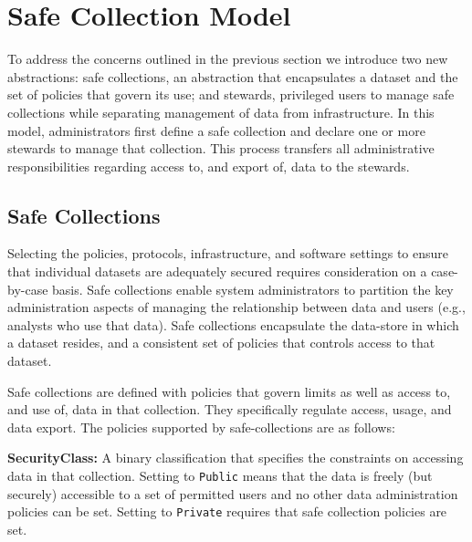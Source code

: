 \section{Safe Collection Model}
\label{sec:architecture}


To address the concerns outlined in the previous section we introduce two
new abstractions: safe collections, an abstraction that encapsulates
a dataset and the set of policies that govern its use; and stewards, privileged users
to manage safe collections while separating management of data from infrastructure.
In this model, administrators first define a safe collection and declare one
or more stewards to manage that collection. This process transfers
all administrative responsibilities regarding access to, and export of, data to the stewards.

\subsection{Safe Collections}

Selecting the policies, protocols, infrastructure, and
software settings to ensure that individual datasets are adequately secured requires consideration
on a case-by-case basis.
Safe collections enable system administrators to partition the key administration
aspects of managing the relationship between data and users (e.g., analysts who use that data).
Safe collections encapsulate the data-store in which a dataset resides, and a consistent set of policies
that controls access to that dataset.

Safe collections are defined with policies that govern limits as well as access to, and use of,
data in that collection. They specifically regulate access, usage, and data export.
The policies supported by safe-collections are as follows:

\textbf{SecurityClass:} A binary classification that specifies the constraints
on accessing data in that collection. Setting to \texttt{Public} means that the data is freely
(but securely) accessible to a set of permitted users and no other
data administration policies can be set.  Setting to \texttt{Private}
requires that safe collection policies are set.

